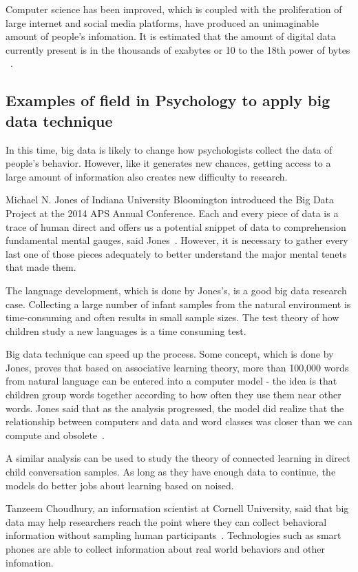 Computer science has been improved, which is coupled with the 
proliferation of large internet and social media platforms,
 have produced an unimaginable amount of people's infomation.
It is estimated that the amount of digital data currently present 
is in the thousands of exabytes or 10 to the 18th power of bytes
~\cite{hid515-00}.

\subsection{Examples of field in Psychology to apply big data technique}

In this time, big data is likely to change how psychologists 
collect the data of people's behavior. 
However, like it generates new 
chances, getting access to a large amount of information also creates
 new difficulty to research. 

Michael N. Jones of 
Indiana University Bloomington introduced the Big Data Project at 
the 2014 APS Annual Conference.
Each and every piece of data is a trace of human direct and 
offers us a potential snippet of data to comprehension 
fundamental mental gauges, said Jones~\cite{hid515-00}. 
However, it is necessary to gather every last one of 
those pieces adequately to better understand the major mental 
tenets that made them.

The language development, which is done by Jones's, is a good big data
 research case. 
Collecting a large number of infant samples from the natural 
environment is time-consuming and often results in small sample 
sizes. The test theory of how children study a new languages is a 
time consuming test.

Big data technique can speed up the process. 
Some concept, which is done by Jones, proves that based on associative
 learning theory, more than 
100,000 words from natural language can be entered into a computer
 model - the idea is that children group words together according 
to how often they use them near other words. 
Jones said that as the
 analysis progressed, the model did realize that the relationship 
between computers and data and word classes was closer than we can 
compute and obsolete~\cite{hid515-00}.

 A similar analysis can be used to study
 the theory of connected learning in direct child conversation 
samples. As long as they have enough data to continue, the 
models do better jobs about learning based on noised.

Tanzeem Choudhury, an information scientist at Cornell University, 
said that big data may help researchers reach the point where they 
can collect behavioral information without sampling human 
participants~\cite{hid515-00}. Technologies such as smart phones are 
able to collect information about real world behaviors and other 
infomation.

